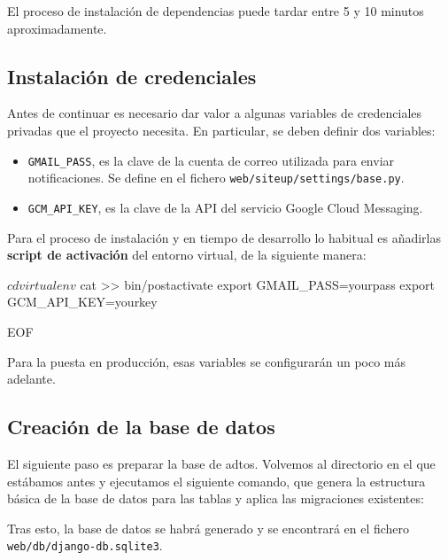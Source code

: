 El proceso de instalación de dependencias puede tardar entre 5 y 10 minutos aproximadamente.

\subsection{Instalación de credenciales}

Antes de continuar es necesario dar valor a algunas variables de credenciales
privadas que el proyecto necesita. En particular, se deben definir dos variables:

\begin{itemize}
\item \texttt{GMAIL\_PASS}, es la clave de la cuenta de correo utilizada para
  enviar notificaciones. Se define en el fichero \texttt{web/siteup/settings/base.py}.
\item \texttt{GCM\_API\_KEY}, es la clave de la API del servicio Google Cloud Messaging.
\end{itemize}

Para el proceso de instalación y en tiempo de desarrollo lo habitual es
añadirlas \textbf{script de activación} del entorno virtual, de la siguiente
manera:

\begin{bashcode}
$ cdvirtualenv
$ cat >> bin/postactivate
export GMAIL_PASS=yourpass
export GCM_API_KEY=yourkey

EOF
\end{bashcode}

Para la puesta en producción, esas variables se configurarán un poco más adelante.

\subsection{Creación de la base de datos}

El siguiente paso es preparar la base de adtos. Volvemos al directorio en el que
estábamos antes y ejecutamos el siguiente comando, que genera la estructura
básica de la base de datos para las tablas y aplica las migraciones existentes:


Tras esto, la base de datos se habrá generado y se encontrará en el fichero\\
\texttt{web/db/django-db.sqlite3}.

